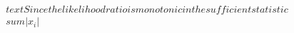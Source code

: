 \documentclass[preview]{standalone}
\begin{document}
\begin{align*}
\quad\\text{Since the likelihood ratio is monotonic in the sufficient statistic } \quad\\sum |x_i|
\end{align*}
\end{document}
